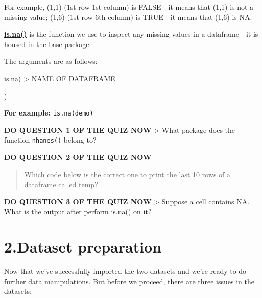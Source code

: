 \documentclass[
]{book}
\begin{document}
For example, (1,1) (1st row 1st column) is FALSE - it means that (1,1) is not a missing value; (1,6) (1st row 6th column) is TRUE - it means that (1,6) is NA.

\href{https://www.rdocumentation.org/packages/base/versions/3.6.2/topics/NA}{\textbf{is.na()}} is the function we use to inspect any missing values in a dataframe - it is housed in the base package.

The arguments are as follows:

is.na(
\textgreater{} NAME OF DATAFRAME

)

\textbf{For example:} \texttt{is.na(demo)}

\textbf{DO QUESTION 1 OF THE QUIZ NOW}
\textgreater{} What package does the function \texttt{nhanes()} belong to?

\textbf{DO QUESTION 2 OF THE QUIZ NOW}

\begin{quote}
Which code below is the correct one to print the last 10 rows of a dataframe called temp?
\end{quote}

\textbf{DO QUESTION 3 OF THE QUIZ NOW}
\textgreater{} Suppose a cell contains NA. What is the output after perform is.na() on it?

\hypertarget{dataset-preparation}{%
\section{2.Dataset preparation}\label{dataset-preparation}}

Now that we've successfully imported the two datasets and we're ready to do further data manipulations. But before we proceed, there are three issues in the datasets:
\end{document}
